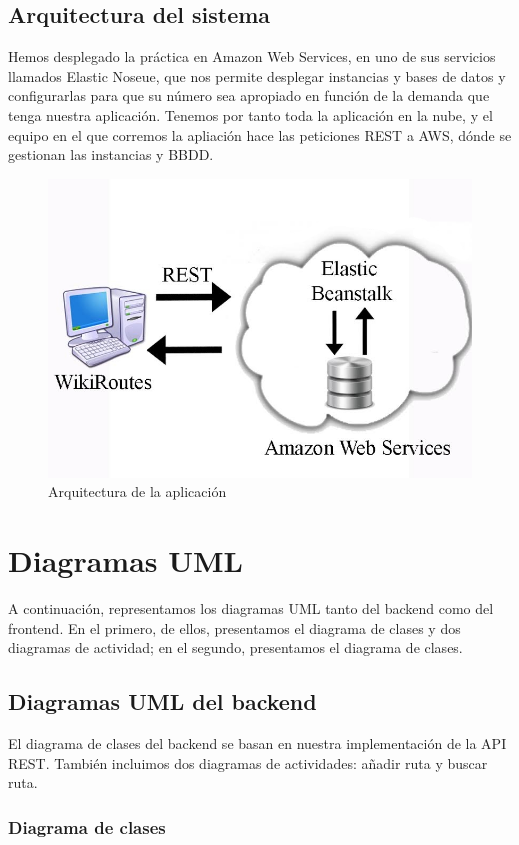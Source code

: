 \documentclass[11pt,a4paper]{article}
\begin{document}
\subsection{Arquitectura del sistema}
Hemos desplegado la práctica en Amazon Web Services, en uno de sus servicios llamados Elastic Noseue, que nos permite desplegar instancias y bases de datos y configurarlas para que su número sea apropiado en función de la demanda que tenga nuestra aplicación. Tenemos por tanto toda la aplicación en la nube, y el equipo en el que corremos la apliación hace las peticiones REST a AWS, dónde se gestionan las instancias y BBDD.
\begin{figure}[htbp]
\centering
\includegraphics[width=0.7\linewidth]{imagenes/arquitectura}
\caption{Arquitectura de la aplicación}
\label{fig:arquitectura}
\end{figure}


\clearpage

\section{Diagramas UML}

A continuación, representamos los diagramas UML tanto del backend como del frontend. En el primero, de ellos, presentamos el diagrama de clases y dos diagramas de actividad; en el segundo, presentamos el diagrama de clases.

\subsection{Diagramas UML del backend}

El diagrama de clases del backend se basan en nuestra implementación de la API REST. También incluimos dos diagramas de actividades: añadir ruta y buscar ruta.  

\subsubsection{Diagrama de clases}
\end{document}
